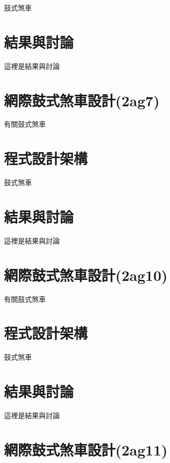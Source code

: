 \documentclass[]{article}
\begin{document}
鼓式煞車

\section{結果與討論}\label{ux7d50ux679cux8207ux8a0eux8ad6-5}

這裡是結果與討論

\section{網際鼓式煞車設計(2ag7)}\label{ux7db2ux969bux9f13ux5f0fux715eux8ecaux8a2dux8a082ag7}

有關鼓式煞車

\section{程式設計架構}\label{ux7a0bux5f0fux8a2dux8a08ux67b6ux69cb-5}

鼓式煞車

\section{結果與討論}\label{ux7d50ux679cux8207ux8a0eux8ad6-6}

這裡是結果與討論

\section{網際鼓式煞車設計(2ag10)}\label{ux7db2ux969bux9f13ux5f0fux715eux8ecaux8a2dux8a082ag10}

有關鼓式煞車

\section{程式設計架構}\label{ux7a0bux5f0fux8a2dux8a08ux67b6ux69cb-6}

鼓式煞車

\section{結果與討論}\label{ux7d50ux679cux8207ux8a0eux8ad6-7}

這裡是結果與討論

\section{網際鼓式煞車設計(2ag11)}\label{ux7db2ux969bux9f13ux5f0fux715eux8ecaux8a2dux8a082ag11}
\end{document}
